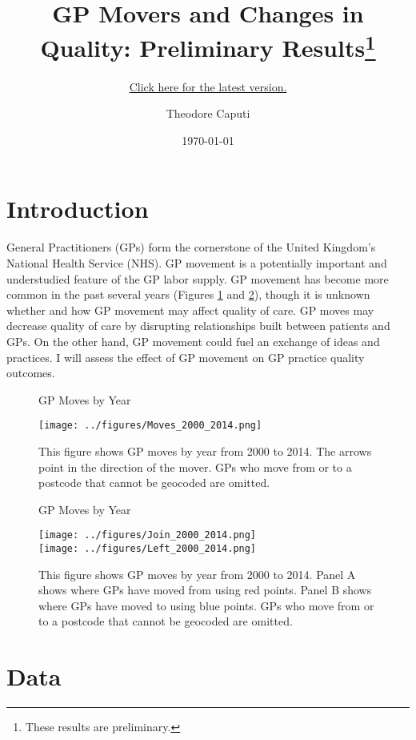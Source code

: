 \documentclass[11pt]{article}
\subtitle{\href{https://www.TheodoreCaputi.com/files/prelims.pdf}{Click here for the latest version.}}
\title{GP Movers and Changes in Quality: Preliminary Results\footnote{These results are preliminary.}}
\author{Theodore Caputi}
\date{\today}
\begin{document}
\maketitle

\tableofcontents
\newpage
\listoffigures
\newpage
\listoftables
\newpage

\section{Introduction}
General Practitioners (GPs) form the cornerstone of the United Kingdom's National Health Service (NHS). GP movement is a potentially important and understudied feature of the GP labor supply. GP movement has become more common in the past several years (Figures \ref{Moves_2000_2014} and \ref{Join_Left_2000_2014}), though it is unknown whether and how GP movement may affect quality of care. GP moves may decrease quality of care by disrupting relationships built between patients and GPs. On the other hand, GP movement could fuel an exchange of ideas and practices. I will assess the effect of GP movement on GP practice quality outcomes.


\begin{figure}[htp]
\centering
\caption{GP Moves by Year}
\texttt{[image: ../figures/Moves\_2000\_2014.png]}\\

\caption*{\footnotesize This figure shows GP moves by year from 2000 to 2014. The arrows point in the direction of the mover. GPs who move from or to a postcode that cannot be geocoded are omitted.}
\label{Moves_2000_2014}
\end{figure}


\begin{figure}[htp]
\centering
\caption{GP Moves by Year}
\texttt{[image: ../figures/Join\_2000\_2014.png]}\\
\texttt{[image: ../figures/Left\_2000\_2014.png]}\\

\caption*{\footnotesize This figure shows GP moves by year from 2000 to 2014. Panel A shows where GPs have moved from using red points. Panel B shows where GPs have moved to using blue points. GPs who move from or to a postcode that cannot be geocoded are omitted.}
\label{Join_Left_2000_2014}
\end{figure}



\section{Data}
\end{document}
